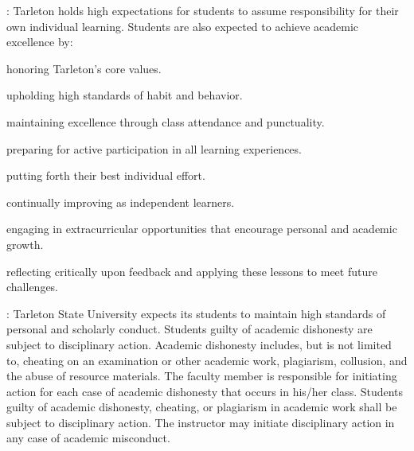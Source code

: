 \documentclass[letterpaper]{article}
\begin{document}
:  Tarleton holds high expectations for students to assume responsibility for their own individual learning.  Students are also expected to achieve academic excellence by:
\bit
  \item honoring Tarleton's core values. 
  \item upholding high standards of habit and behavior.
  \item maintaining excellence through class attendance and punctuality.
  \item preparing for active participation in all learning experiences. 
  \item putting forth their best individual effort.
  \item continually improving as independent learners.
  \item engaging in extracurricular opportunities that encourage personal and academic growth.
  \item reflecting critically upon feedback and applying these lessons to meet future challenges.
\eit

:  Tarleton State University expects its students to maintain high standards of personal and scholarly conduct.  Students guilty of academic dishonesty are subject to disciplinary action.  Academic dishonesty includes, but is not limited to, cheating on an examination or other academic work, plagiarism, collusion, and the abuse of resource materials.  The faculty member is responsible for initiating action for each case of academic dishonesty that occurs in his/her class.  Students guilty of academic dishonesty, cheating, or plagiarism in academic work shall be subject to disciplinary action.  The instructor may initiate disciplinary action in any case of academic misconduct.
\end{document}
